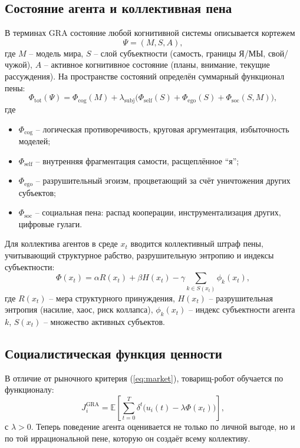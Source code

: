 \documentclass[a4paper,12pt]{article}
\begin{document}
\subsection{Состояние агента и коллективная пена}
В терминах GRA состояние любой когнитивной системы описывается кортежем
\begin{equation}\label{eq:psi}
\Psi = (M, S, A),
\end{equation}
где $M$ -- модель мира, $S$ -- слой субъектности (самость, границы Я/МЫ, свой/чужой), $A$ -- активное когнитивное состояние (планы, внимание, текущие рассуждения). На пространстве состояний определён суммарный функционал пены:
\begin{equation}\label{eq:total_foam}
\Phi_{\text{tot}}(\Psi) = \Phi_{\text{cog}}(M) + \lambda_{\text{subj}}\bigl(\Phi_{\text{self}}(S) + \Phi_{\text{ego}}(S) + \Phi_{\text{soc}}(S, M)\bigr),
\end{equation}
где
\begin{itemize}
\item $\Phi_{\text{cog}}$ -- логическая противоречивость, круговая аргументация, избыточность моделей;
\item $\Phi_{\text{self}}$ -- внутренняя фрагментация самости, расщеплённое ``я'';
\item $\Phi_{\text{ego}}$ -- разрушительный эгоизм, процветающий за счёт уничтожения других субъектов;
\item $\Phi_{\text{soc}}$ -- социальная пена: распад кооперации, инструментализация других, цифровые гулаги.
\end{itemize}

Для коллектива агентов в среде $x_t$ вводится коллективный штраф пены, учитывающий структурное рабство, разрушительную энтропию и индексы субъектности:
\begin{equation}\label{eq:collective_pena}
\Phi(x_t) = \alpha R(x_t) + \beta H(x_t) - \gamma \sum_{k \in S(x_t)} \phi_k(x_t),
\end{equation}
где $R(x_t)$ -- мера структурного принуждения, $H(x_t)$ -- разрушительная энтропия (насилие, хаос, риск коллапса), $\phi_k(x_t)$ -- индекс субъектности агента $k$, $S(x_t)$ -- множество активных субъектов.

\subsection{Социалистическая функция ценности}
В отличие от рыночного критерия (\ref{eq:market}), товарищ-робот обучается по функционалу:
\begin{equation}\label{eq:gra_objective}
J_i^{\text{GRA}} = \mathbb{E}\left[\sum_{t=0}^{T} \delta^t \bigl(u_i(t) - \lambda \Phi(x_t)\bigr)\right],
\end{equation}
с $\lambda > 0$. Теперь поведение агента оценивается не только по личной выгоде, но и по той иррациональной пене, которую он создаёт всему коллективу.
\end{document}
